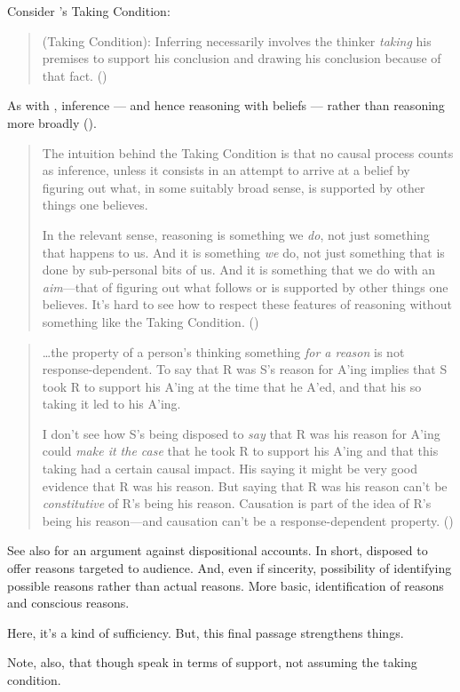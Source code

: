 \begin{note}[Boghossian]
  Consider \citeauthor{Boghossian:2014aa}'s Taking Condition:
  \begin{quote}
    (Taking Condition): Inferring necessarily involves the thinker \emph{taking} his premises to support his conclusion and drawing his conclusion because of that fact.%
    \mbox{}\hfill\mbox{(\Citeyear[5]{Boghossian:2014aa})}
  \end{quote}
  As with \citeauthor{Armstrong:1968vh}, inference --- and hence reasoning with beliefs --- rather than reasoning more broadly (\Citeyear[cf][2]{Boghossian:2014aa}).

  \begin{quote}
    The intuition behind the Taking Condition is that no causal process counts as inference, unless it consists in an attempt to arrive at a belief by figuring out what, in some suitably broad sense, is supported by other things one believes.

    In the relevant sense, reasoning is something we \emph{do}, not just something that happens to us.
    And it is something \emph{we} do, not just something that is done by sub-personal bits of us.
    And it is something that we do with an \emph{aim}---that of figuring out what follows or is supported by other things one believes.
    It's hard to see how to respect these features of reasoning without something like the Taking Condition.%
    \mbox{}\hfill\mbox{(\Citeyear[5]{Boghossian:2014aa})}
  \end{quote}

  \begin{quote}
    \dots the property of a person's thinking something \emph{for a reason} is not response-dependent.
    To say that R was S's reason for A'ing implies that S took R to support his A'ing at the time that he A'ed, and that his so taking it led to his A'ing.

    I don't see how S's being disposed to \emph{say} that R was his reason for A'ing could \emph{make it the case} that he took R to support his A'ing and that this taking had a certain causal impact.
    His saying it might be very good evidence that R was his reason.
    But saying that R was his reason can't be \emph{constitutive} of R's being his reason.
    Causation is part of the idea of R's being his reason---and causation can't be a response-dependent property.%
    \mbox{}\hfill\mbox{(\citeyear[10--11]{Boghossian:2014aa})}
  \end{quote}

  {
    \color{red}
    See also \citeauthor[26--28]{Harman:1973ww} for an argument against dispositional accounts.
    In short, disposed to offer reasons targeted to audience.
    And, even if sincerity, possibility of identifying possible reasons rather than actual reasons.
    More basic, identification of reasons and conscious reasons.
  }

  {
    \color{red}
    Here, it's a kind of sufficiency.
    But, this final passage strengthens things.
  }

  {
    \color{green}
    Note, also, that though speak in terms of support, not assuming the taking condition.
  }
\end{note}

